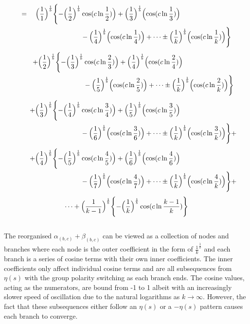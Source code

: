 \documentclass{amsart}
\begin{document}
	\[
	\begin{aligned}
		= \quad \Bigl( \frac{1}{1} \Bigr)^\frac1b \Biggl\{ -\Bigl( \frac{1}{2} \Bigr)^\frac1b &\cos(c \ln \frac{1}{2}) \Bigr) + \Bigl( \frac{1}{3} \Bigr)^\frac1b \Bigl( \cos(c \ln \frac{1}{3}) \Bigr) \\
		& -\Bigl( \frac{1}{4} \Bigr)^\frac1b \Bigl( \cos(c \ln \frac{1}{4}) \Bigr) + \dots \pm \Bigl( \frac{1}{k} \Bigr)^\frac1b \Bigl( \cos(c \ln \frac{1}{k}) \Bigr) \Biggr\} 
	\end{aligned}
	\]
	\[
	\begin{aligned}
		\quad\quad +\Bigl( \frac{1}{2} \Bigr)^\frac1b \Biggl\{ -\Bigl( \frac{1}{3} \Bigr)^\frac1b &\cos(c \ln \frac{2}{3}) \Bigr) + \Bigl( \frac{1}{4} \Bigr)^\frac1b \Bigl( \cos(c \ln \frac{2}{4}) \Bigr) \\
		& -\Bigl( \frac{1}{5} \Bigr)^\frac1b \Bigl( \cos(c \ln \frac{2}{5}) \Bigr) + \dots \pm \Bigl( \frac{1}{k} \Bigr)^\frac1b \Bigl( \cos(c \ln \frac{2}{k}) \Bigr) \Biggr\}
	\end{aligned}
	\]
	\[
	\begin{aligned}
		\quad\quad +\Bigl( \frac{1}{3} \Bigr)^\frac1b \Biggl\{ -\Bigl( \frac{1}{4} \Bigr)^\frac1b &\cos(c \ln \frac{3}{4}) \Bigr) + \Bigl( \frac{1}{5} \Bigr)^\frac1b \Bigl( \cos(c \ln \frac{3}{5}) \Bigr) \\
		& -\Bigl( \frac{1}{6} \Bigr)^\frac1b \Bigl( \cos(c \ln \frac{3}{6}) \Bigr) + \dots \pm \Bigl( \frac{1}{k} \Bigr)^\frac1b \Bigl( \cos(c \ln \frac{3}{k}) \Bigr) \Biggr\} + 
	\end{aligned}
	\]
	\[
	\begin{aligned}
		\quad\quad +\Bigl( \frac{1}{4} \Bigr)^\frac1b \Biggl\{ -\Bigl( \frac{1}{5} \Bigr)^\frac1b &\cos(c \ln \frac{4}{5}) \Bigr) + \Bigl( \frac{1}{6} \Bigr)^\frac1b \Bigl( \cos(c \ln \frac{4}{6}) \Bigr) \\
		& -\Bigl( \frac{1}{7} \Bigr)^\frac1b \Bigl( \cos(c \ln \frac{4}{7}) \Bigr) + \dots \pm \Bigl( \frac{1}{k} \Bigr)^\frac1b \Bigl( \cos(c \ln \frac{4}{k}) \Bigr) \Biggr\} + 
	\end{aligned}
	\]
	\[ \dots + \Bigl( \frac{1}{k-1} \Bigr)^\frac1b \Biggl\{ -\Bigl( \frac{1}{k} \Bigr)^\frac1b \cos(c \ln \frac{k-1}{k}) \Biggr\} \]
	
	\[\]
	
	The reorganised $\alpha_{(b,c)} + \beta_{(b,c)}$ can be viewed as a collection of nodes and branches where each node is the outer coefficient in the form of $\frac{1}{k}^{\frac{1}{b}}$ and each branch is a series of cosine terms with their own inner coefficients. The inner coefficients only affect individual cosine terms and are all subsequences from $\eta(s)$ with the group polarity switching as each branch ends. The cosine values, acting as the numerators, are bound from -1 to 1 albeit with an increasingly slower speed of oscillation due to the natural logarithms as $k \to \infty$. However, the fact that these subsequences either follow an $\eta(s)$ or a $-\eta(s)$ pattern causes each branch to converge.
	
\end{document}
